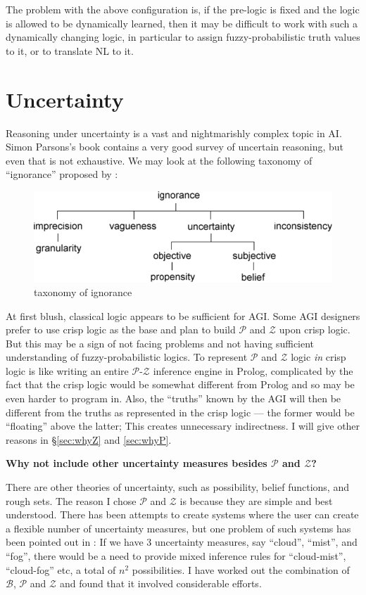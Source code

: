 The problem with the above configuration is, if the pre-logic is fixed and the logic is allowed to be dynamically learned, then it may be difficult to work with such a dynamically changing logic, in particular to assign fuzzy-probabilistic truth values to it, or to translate NL to it.



\section{Uncertainty}

Reasoning under uncertainty is a vast and nightmarishly complex topic in AI.  Simon Parsons's book \citep*{Parsons2001} contains a very good survey of uncertain reasoning, but even that is not exhaustive.  We may look at the following taxonomy of ``ignorance'' proposed by \citep*{Bosc1997}:
\begin{figure}[H]
\centering
\includegraphics[scale=0.7]{IgnoranceTaxonomy.png}
\caption{taxonomy of ignorance}
\end{figure}

At first blush, classical logic appears to be sufficient for AGI.  Some AGI designers prefer to use crisp logic as the base and plan to build $\mathcal{P}$ and $\mathcal{Z}$ upon crisp logic.  But this may be a sign of not facing problems and not having sufficient understanding of fuzzy-probabilistic logics.  To represent $\mathcal{P}$ and $\mathcal{Z}$ logic \textit{in} crisp logic is like writing an entire $\mathcal{P}$-$\mathcal{Z}$ inference engine in Prolog, complicated by the fact that the crisp logic would be somewhat different from Prolog and so may be even harder to program in.  Also, the ``truths'' known by the AGI will then be different from the truths as represented in the crisp logic --- the former would be ``floating'' above the latter;  This creates unnecessary indirectness.  I will give other reasons in \S\ref{sec:whyZ} and \ref{sec:whyP}.

\textbf{Why not include other uncertainty measures besides $\mathcal{P}$ and $\mathcal{Z}$?}

There are other theories of uncertainty, such as possibility, belief functions, and rough sets.  The reason I chose $\mathcal{P}$ and $\mathcal{Z}$ is because they are simple and best understood.  There has been attempts to create systems where the user can create a flexible number of uncertainty measures, but one problem of such systems has been pointed out in \citep*{Parsons2001}:  If we have 3 uncertainty measures, say ``cloud'', ``mist'', and ``fog'', there would be a need to provide mixed inference rules for ``cloud-mist'', ``cloud-fog'' etc, a total of $n^2$ possibilities.  I have worked out the combination of $\mathcal{B}$, $\mathcal{P}$ and $\mathcal{Z}$ and found that it involved considerable efforts.

